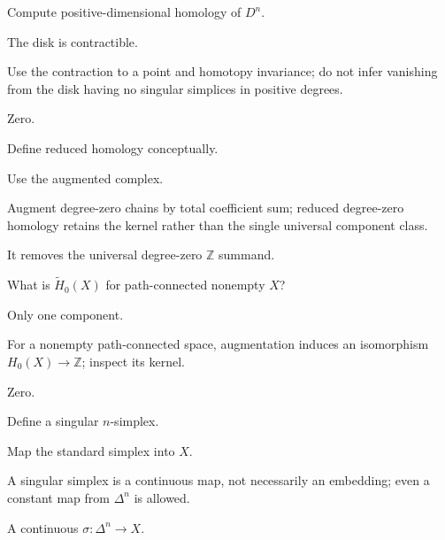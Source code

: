 \begin{exercise}\label{exr:viii17-08}
Compute positive-dimensional homology of \(D^n\).
\end{exercise}
\begin{hint}
The disk is contractible.

Use the contraction to a point and homotopy invariance; do not infer vanishing from the disk having no singular simplices in positive degrees.
\end{hint}
\begin{solution}
Zero.
\end{solution}

\begin{exercise}\label{exr:viii17-09}
Define reduced homology conceptually.
\end{exercise}
\begin{hint}
Use the augmented complex.

Augment degree-zero chains by total coefficient sum; reduced degree-zero homology retains the kernel rather than the single universal component class.
\end{hint}
\begin{solution}
It removes the universal degree-zero \(\mathbb Z\) summand.
\end{solution}

\begin{exercise}\label{exr:viii17-10}
What is \(\widetilde H_0(X)\) for path-connected nonempty \(X\)?
\end{exercise}
\begin{hint}
Only one component.

For a nonempty path-connected space, augmentation induces an isomorphism \(H_0(X)\to\mathbb Z\); inspect its kernel.
\end{hint}
\begin{solution}
Zero.
\end{solution}

\begin{exercise}\label{exr:viii17-11}
Define a singular \(n\)-simplex.
\end{exercise}
\begin{hint}
Map the standard simplex into \(X\).

A singular simplex is a continuous map, not necessarily an embedding; even a constant map from \(\Delta^n\) is allowed.
\end{hint}
\begin{solution}
A continuous \(\sigma:\Delta^n\to X\).
\end{solution}

